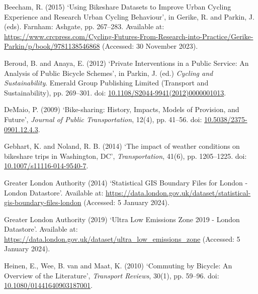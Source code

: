 \documentclass[
  a4paper,
  DIV=11,
  numbers=noendperiod]{scrartcl}
\newlength{\cslhangindent}
\newlength{\cslentryspacingunit} %
\newenvironment{CSLReferences}[2] %
 {%
  \setlength{\parindent}{0pt}
  \ifodd #1
  \let\oldpar\par
  \def\par{\hangindent=\cslhangindent\oldpar}
  \fi
  \setlength{\parskip}{#2\cslentryspacingunit}
 }%
 {}
\begin{document}
\hypertarget{refs}{}
\begin{CSLReferences}{0}{0}
\leavevmode{}%
Beecham, R. (2015) {`Using {Bikeshare} {Datasets} to {Improve} {Urban}
{Cycling} {Experience} and {Research} {Urban} {Cycling} {Behaviour}'},
in Gerike, R. and Parkin, J. (eds). Farnham: Ashgate, pp. 267--283.
Available at:
\url{https://www.crcpress.com/Cycling-Futures-From-Research-into-Practice/Gerike-Parkin/p/book/9781138546868}
(Accessed: 30 November 2023).

\leavevmode{}%
Beroud, B. and Anaya, E. (2012) {`Private {Interventions} in a {Public}
{Service}: {An} {Analysis} of {Public} {Bicycle} {Schemes}'}, in Parkin,
J. (ed.) \emph{Cycling and {Sustainability}}. Emerald Group Publishing
Limited (Transport and {Sustainability}), pp. 269--301. doi:
\href{https://doi.org/10.1108/S2044-9941(2012)0000001013}{10.1108/S2044-9941(2012)0000001013}.

\leavevmode{}%
DeMaio, P. (2009) {`Bike-sharing: {History}, {Impacts}, {Models} of
{Provision}, and {Future}'}, \emph{Journal of Public Transportation},
12(4), pp. 41--56. doi:
\href{https://doi.org/10.5038/2375-0901.12.4.3}{10.5038/2375-0901.12.4.3}.

\leavevmode{}%
Gebhart, K. and Noland, R. B. (2014) {`The impact of weather conditions
on bikeshare trips in {Washington}, {DC}'}, \emph{Transportation},
41(6), pp. 1205--1225. doi:
\href{https://doi.org/10.1007/s11116-014-9540-7}{10.1007/s11116-014-9540-7}.

\leavevmode{}%
Greater London Authority (2014) {`Statistical {GIS} {Boundary} {Files}
for {London} - {London} {Datastore}'}. Available at:
\url{https://data.london.gov.uk/dataset/statistical-gis-boundary-files-london}
(Accessed: 5 January 2024).

\leavevmode{}%
Greater London Authority (2019) {`Ultra {Low} {Emissions} {Zone} 2019 -
{London} {Datastore}'}. Available at:
\url{https://data.london.gov.uk/dataset/ultra_low_emissions_zone}
(Accessed: 5 January 2024).

\leavevmode{}%
Heinen, E., Wee, B. van and Maat, K. (2010) {`Commuting by {Bicycle}:
{An} {Overview} of the {Literature}'}, \emph{Transport Reviews}, 30(1),
pp. 59--96. doi:
\href{https://doi.org/10.1080/01441640903187001}{10.1080/01441640903187001}.


\end{CSLReferences}
\end{document}
